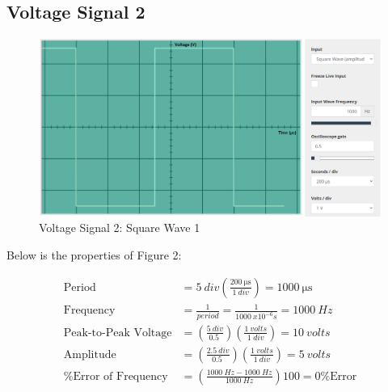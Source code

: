 \documentclass[12pt]{article}
\begin{document}
\subsection{Voltage Signal 2}
\begin{figure}[H]
    \begin{center}
        \includegraphics[scale=0.6]{Figure-2.png}
        \caption { Voltage Signal 2: Square Wave 1}
    \end{center}
\end{figure}

\newpage

Below is the properties of Figure 2:

\begin{equation*}
    \begin{split}
        \text{Period} & = \SI{5}{div}\left(\frac{\SI{200}{\us}}{\SI{1}{div}}\right) = \SI{1000}{\us} \\
    \text{Frequency} & = \frac{1}{period} =\frac{1}{\SI{1000}{x10^{-6} s}} = \SI{1000}{Hz} \\
        \text{Peak-to-Peak Voltage} & = \left(\frac{\SI{5}{div}}{\SI{0.5}{}}\right)\left(\frac{\SI{1}{volts}}{\SI{1}{div}}\right) = \SI{10}{volts} \\
        \text{Amplitude} & = \left(\frac{\SI{2.5}{div}}{\SI{0.5}{}}\right)\left(\frac{\SI{1}{volts}}{\SI{1}{div}}\right) = \SI{5}{volts} \\
        \text{\% Error of Frequency} & = \left(\frac{\SI{1000}{Hz} - \SI{1000}{Hz}}{\SI{1000}{Hz}}\right)100 = 0 \text{\% Error}
    \end{split}
\end{equation*}
\end{document}
